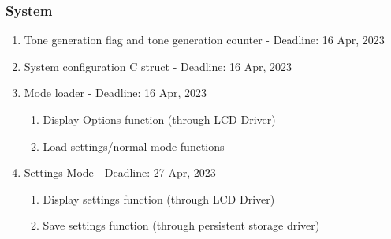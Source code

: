 \documentclass[11pt,a4paper,twocolumn]{scrartcl}
\begin{document}
\subsubsection{System}
\begin{enumerate}
    \item Tone generation flag and tone generation counter - Deadline: 16 Apr, 2023
    \item System configuration C struct - Deadline:  16 Apr, 2023
    \item Mode loader - Deadline: 16 Apr, 2023
    \begin{enumerate}
        \item Display Options function (through LCD Driver)
        \item Load settings/normal mode functions
    \end{enumerate}
    \item Settings Mode - Deadline: 27 Apr, 2023
    \begin{enumerate}
        \item Display settings function (through LCD Driver)
        \item Save settings function (through persistent storage driver)
    \end{enumerate}
\end{enumerate}
\end{document}
